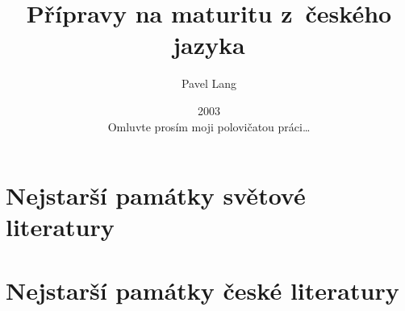 \documentclass[a4paper,11pt,titlepage,twocolumn,openany,oneside]{book}
\title{Přípravy na maturitu z~českého jazyka}
\author{Pavel Lang}
\date{2003\\Omluvte prosím moji polovičatou práci\dots{}}
\begin{document}
\frontmatter
\maketitle
\tableofcontents

\mainmatter

\chapter{Nejstarší památky světové literatury}

\chapter{Nejstarší památky české literatury}































\onecolumn
\appendix


\printindex{}
\end{document}
